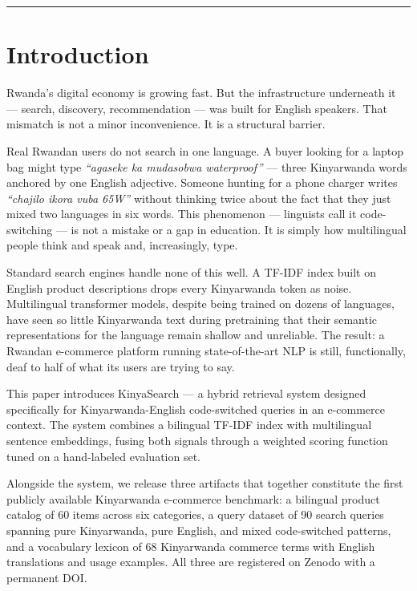 \documentclass[11pt,a4paper]{article}
\begin{document}
\hrule
\vspace{14pt}

\section{Introduction}

Rwanda's digital economy is growing fast. But the infrastructure underneath
it — search, discovery, recommendation — was built for English speakers.
That mismatch is not a minor inconvenience. It is a structural barrier.

Real Rwandan users do not search in one language. A buyer looking for a
laptop bag might type \textit{``agaseke ka mudasobwa waterproof''} — three
Kinyarwanda words anchored by one English adjective. Someone hunting for a
phone charger writes \textit{``chajilo ikora vuba 65W''} without thinking
twice about the fact that they just mixed two languages in six words. This
phenomenon — linguists call it code-switching — is not a mistake or a gap
in education. It is simply how multilingual people think and speak and,
increasingly, type.

Standard search engines handle none of this well. A TF-IDF index built on
English product descriptions drops every Kinyarwanda token as noise.
Multilingual transformer models, despite being trained on dozens of
languages, have seen so little Kinyarwanda text during pretraining that
their semantic representations for the language remain shallow and
unreliable. The result: a Rwandan e-commerce platform running
state-of-the-art NLP is still, functionally, deaf to half of what its
users are trying to say.

This paper introduces KinyaSearch — a hybrid retrieval system designed
specifically for Kinyarwanda-English code-switched queries in an e-commerce
context. The system combines a bilingual TF-IDF index with multilingual
sentence embeddings, fusing both signals through a weighted scoring function
tuned on a hand-labeled evaluation set.

Alongside the system, we release three artifacts that together constitute
the first publicly available Kinyarwanda e-commerce benchmark: a bilingual
product catalog of 60 items across six categories, a query dataset of 90
search queries spanning pure Kinyarwanda, pure English, and mixed
code-switched patterns, and a vocabulary lexicon of 68 Kinyarwanda commerce
terms with English translations and usage examples. All three are registered
on Zenodo with a permanent DOI.
\end{document}
